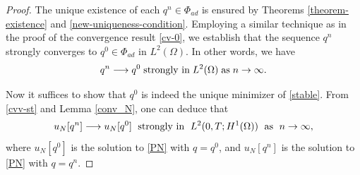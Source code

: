\documentclass[10pt,a4paper]{amsart}
\begin{document}
\begin{proof}
The unique existence of each $q^n\in\Phi_{ad}$ is ensured by Theorems \ref{theorem-existence} and \ref{new-uniqueness-condition}. Employing a similar technique as in the proof of the convergence result \eqref{cv-0}, we establish that the sequence $q^n$ strongly converges to $q^0\in\Phi_{ad}$ in $L^2(\Omega)$. In other words, we have
\begin{equation}\label{cvv-st}
q^n\longrightarrow q^0\; \hbox{strongly in}\; L^2(\Omega)\; \hbox{as}\; n\rightarrow\infty.
\end{equation}


Now it suffices to show that $q^0$ is indeed the unique minimizer of \eqref{stable}. From \eqref{cvv-st} and Lemma \ref{conv_N}, one can deduce that 
\begin{equation} \label{convergancefaible-NNN}
    u_N[q^n]\longrightarrow u_N[q^0]\; \hbox{ strongly in }\; L^2(0,T;H^1(\Omega))\; \hbox{ as }\; n\to\infty, 
\end{equation}
where $u_N[q^0]$ is the solution to \eqref{PN} with $q=q^0$, and $u_N[q^n]$ is the solution to \eqref{PN} with $q=q^n$.


\end{proof}
\end{document}
